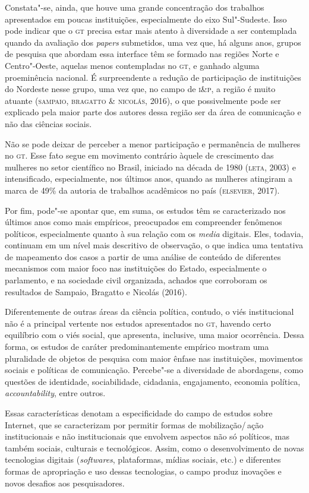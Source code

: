 {Constata"-se, ainda, que houve uma grande concentração dos trabalhos
apresentados em poucas instituições, especialmente do eixo Sul"-Sudeste.
Isso pode indicar que o \textsc{gt} precisa estar mais atento à diversidade a ser
contemplada quando da avaliação dos \textit{papers} submetidos, uma vez
que, há alguns anos, grupos de pesquisa que abordam essa interface têm
se formado nas regiões Norte e Centro"-Oeste, aquelas menos contempladas
no \textsc{gt}, e ganhado alguma proeminência nacional. É surpreendente a redução
de participação de instituições do Nordeste nesse grupo, uma vez que, no
campo de \textsc{i\&p}, a região é muito atuante (\textsc{sampaio,
bragatto \& nicolás}, 2016), o que possivelmente pode ser explicado pela
maior parte dos autores dessa região ser da área de comunicação e
não das ciências sociais.

Não se pode deixar de perceber a menor participação e permanência de
mulheres no \textsc{gt}. Esse fato segue em movimento contrário àquele de
crescimento das mulheres no setor científico no Brasil, iniciado na
década de 1980 (\textsc{leta}, 2003) e intensificado, especialmente, nos últimos
anos, quando as mulheres atingiram a marca de 49\% da autoria de
trabalhos acadêmicos no país (\textsc{elsevier}, 2017).

Por fim, pode"-se apontar que, em suma, os estudos têm se caracterizado
nos últimos anos como mais empíricos, preocupados em compreender
fenômenos políticos, especialmente quanto à sua relação com os
\textit{media} digitais. Eles, todavia, continuam em um nível mais
descritivo de observação, o que indica uma tentativa de mapeamento dos
casos a partir de uma análise de conteúdo de diferentes mecanismos com
maior foco nas instituições do Estado, especialmente o parlamento, e na
sociedade civil organizada, achados que corroboram os resultados de
Sampaio, Bragatto e Nicolás (2016).

Diferentemente de outras áreas da ciência política, contudo, o viés
institucional não é a principal vertente nos estudos apresentados no \textsc{gt},
havendo certo equilíbrio com o viés social, que apresenta, inclusive,
uma maior ocorrência. Dessa forma, os estudos de caráter
predominantemente empírico mostram uma pluralidade de objetos de
pesquisa com maior ênfase nas instituições, movimentos sociais e
políticas de comunicação. Percebe"-se a diversidade de abordagens, como
questões de identidade, sociabilidade, cidadania, engajamento, economia
política, \textit{accountability}, entre outros.

Essas características denotam a especificidade do campo de estudos sobre
Internet, que se caracterizam por permitir formas de mobilização/\,ação
institucionais e não institucionais que envolvem aspectos não só
políticos, mas também sociais, culturais e tecnológicos. Assim, como o
desenvolvimento de novas tecnologias digitais (\textit{softwares},
plataformas, mídias sociais, etc.) e diferentes formas de apropriação e
uso dessas tecnologias, o campo produz inovações e novos desafios aos
pesquisadores.

}
